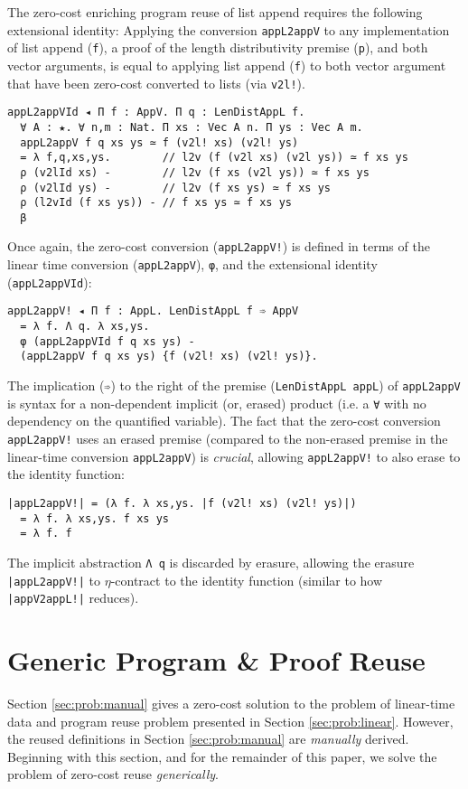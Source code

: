 \documentclass[acmsmall]{acmart}\settopmatter{}
\newcommand{\refsec}[1]{Section \ref{sec:#1}}
\newcommand{\labsec}[1]{\label{sec:#1}}
\begin{document}
The zero-cost enriching program reuse of list append requires
the following extensional identity:
Applying the conversion \verb;appL2appV; to any implementation of
list append (\verb;f;), a proof of the length distributivity premise (\verb;p;),
and both vector arguments, is equal
to applying list append (\verb;f;) to both vector argument that have been
zero-cost converted to lists (via \verb;v2l!;).
\begin{verbatim}
appL2appVId ◂ Π f : AppV. Π q : LenDistAppL f.
  ∀ A : ★. ∀ n,m : Nat. Π xs : Vec A n. Π ys : Vec A m.
  appL2appV f q xs ys ≃ f (v2l! xs) (v2l! ys)
  = λ f,q,xs,ys.        // l2v (f (v2l xs) (v2l ys)) ≃ f xs ys
  ρ (v2lId xs) -        // l2v (f xs (v2l ys)) ≃ f xs ys
  ρ (v2lId ys) -        // l2v (f xs ys) ≃ f xs ys
  ρ (l2vId (f xs ys)) - // f xs ys ≃ f xs ys
  β
\end{verbatim}
Once again, the zero-cost conversion (\verb;appL2appV!;) is defined in
terms of the linear time conversion (\verb;appL2appV;),
\verb;φ;, and the extensional identity (\verb;appL2appVId;):
\begin{verbatim}
appL2appV! ◂ Π f : AppL. LenDistAppL f ➾ AppV
  = λ f. Λ q. λ xs,ys. 
  φ (appL2appVId f q xs ys) - 
  (appL2appV f q xs ys) {f (v2l! xs) (v2l! ys)}.
\end{verbatim}
The implication (\verb;➾;) to the right of the
premise (\verb;LenDistAppL appL;) of \verb;appL2appV; is syntax for a
non-dependent implicit (or, erased) product (i.e. a \verb;∀; with no
dependency on the quantified variable).
The fact that the zero-cost conversion \verb;appL2appV!; uses an
erased premise (compared to the non-erased premise in the linear-time
conversion \verb;appL2appV;) is \textit{crucial},
allowing \verb;appL2appV!; to also erase to the identity function:
\begin{verbatim}
|appL2appV!| = (λ f. λ xs,ys. |f (v2l! xs) (v2l! ys)|) 
  = λ f. λ xs,ys. f xs ys 
  = λ f. f
\end{verbatim}
The implicit abstraction \verb;Λ q; is discarded by erasure,
allowing the erasure \verb;|appL2appV!|; to $\eta$-contract to the
identity function (similar to how \verb;|appV2appL!|; reduces).

\section{Generic Program \& Proof Reuse}
\labsec{prog}

\refsec{prob:manual} gives a zero-cost solution to the problem of
linear-time data and program reuse problem presented in
\refsec{prob:linear}. However, the reused definitions in
\refsec{prob:manual} are \textit{manually} derived. Beginning with
this section, and for the remainder of this paper, we solve the
problem of zero-cost reuse \textit{generically}.
\end{document}
